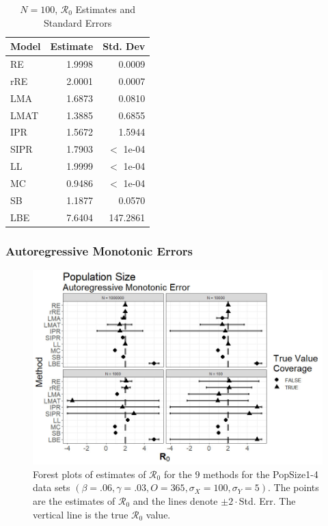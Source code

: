 \documentclass[12pt]{article}
\newcommand{\xxsir}{\ensuremath{9} } %
\newcommand{\rr}{\ensuremath{\mathcal{R}_0}}
\begin{document}
\begin{table}[H]
	
	\centering
	\begin{tabular}[t]{l|r|r}
		\hline
		Model & Estimate & Std. Dev\\
		\hline
		RE & 1.9998 & 0.0009\\
		\hline
		rRE & 2.0001 & 0.0007\\
		\hline
		LMA & 1.6873 & 0.0810\\
		\hline
		LMAT & 1.3885 & 0.6855\\
		\hline
		IPR & 1.5672 & 1.5944\\
		\hline
		SIPR & 1.7903 & $<$ 1e-04\\
		\hline
		LL & 1.9999 & $<$ 1e-04\\
		\hline
		MC & 0.9486 & $<$ 1e-04\\
		\hline
		SB & 1.1877 & 0.0570\\
		\hline
		LBE & 7.6404 & 147.2861\\
		\hline
	\end{tabular}
	\caption{$N = 100$, $\rr$ Estimates and Standard Errors}
\end{table}

\subsubsection{Autoregressive Monotonic Errors}

\begin{figure}[H]
	\centering
	\includegraphics[scale=0.5]{images/popsize_arm.jpg}
	\caption{Forest plots of estimates of $\rr$ for the \xxsir methods for the PopSize1-4 data sets $(\beta=.06, \gamma=.03, O=365, \sigma_X=100, \sigma_Y=5)$.  The points are the estimates of $\rr$ and the lines denote $\pm 2\cdot $Std. Err.  The vertical line is the true $\rr$ value.}
\end{figure}
\end{document}
